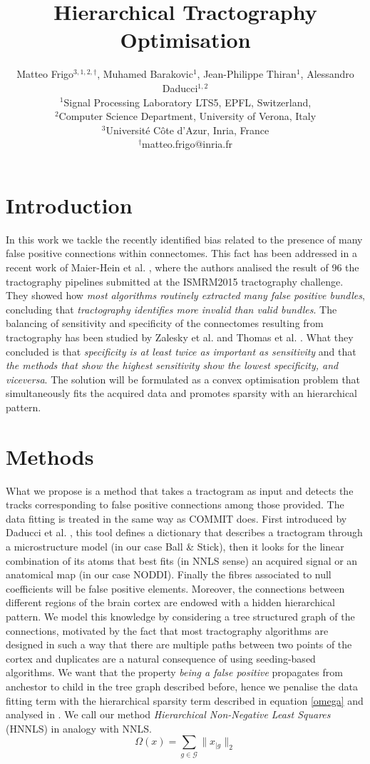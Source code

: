 \documentclass[10pt, a4paper]{article}
\title{Hierarchical Tractography Optimisation}
\date{}
\author{
Matteo Frigo$^{3,1,2,\dagger}$, Muhamed Barakovic$^{1}$, Jean-Philippe Thiran$^{1}$, Alessandro Daducci$^{1,2}$\\
$^{1}$Signal Processing Laboratory LTS5, EPFL, Switzerland,\\ $^{2}$Computer Science Department, University of Verona, Italy\\ $^{3}$Universit\'{e} C\^{o}te d'Azur, Inria, France\\
$^{\dagger}$matteo.frigo@inria.fr
}
\begin{document}
\maketitle
\section{Introduction}In this work we tackle the recently identified bias related to the presence of many false positive connections within connectomes. This fact has been addressed in a recent work of Maier-Hein et al. \cite{meierhein}, where the authors analised the result of 96 the tractography pipelines submitted at the ISMRM2015 tractography challenge. They showed how \emph{most algorithms routinely extracted many false positive bundles}, concluding that \emph{tractography identifies more invalid than valid bundles}. The balancing of sensitivity and specificity of the connectomes resulting from tractography has been studied by Zalesky et al. \cite{zalesky} and Thomas et al. \cite{thomas}. What they concluded is that \emph{specificity is at least twice as important as sensitivity} and that \emph{the methods that show the highest sensitivity show the lowest specificity, and viceversa}. The solution will be formulated as a convex optimisation problem that simultaneously fits the acquired data and promotes sparsity with an hierarchical pattern.

\section{Methods}What we propose is a method that takes a tractogram as input and detects the tracks corresponding to false positive connections among those provided. The data fitting is treated in the same way as COMMIT does. First introduced by Daducci et al. \cite{daducci}, this tool defines a dictionary that describes a tractogram through a microstructure model (in our case Ball \& Stick), then it looks for the linear combination of its atoms that best fits (in NNLS sense) an acquired signal or an anatomical map (in our case NODDI). Finally the fibres associated to null coefficients will be false positive elements. Moreover, the connections between different regions of the brain cortex are endowed with a hidden hierarchical pattern. We model this knowledge by considering a tree structured graph of the connections, motivated by the fact that most tractography algorithms are designed in such a way that there are multiple paths between two points of the cortex and duplicates are a natural consequence of using seeding-based algorithms. We want that the property \emph{being a false positive} propagates from anchestor to child in the tree graph described before, hence we penalise the data fitting term with the hierarchical sparsity term described in equation \eqref{omega} and analysed in \cite{jenatton}. We call our method \emph{Hierarchical Non-Negative Least Squares} (HNNLS) in analogy with NNLS.
\begin{equation}
\label{omega} \Omega(x) = \sum_{g\in\mathcal{G}}\|x_{|g}\|_2
\end{equation}
\end{document}
